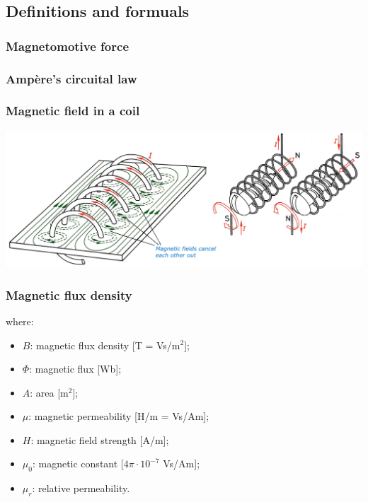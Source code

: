 \documentclass{article}
\begin{document}
\subsection{Definitions and formuals}
\subsubsection{Magnetomotive force}

\subsubsection{Ampère's circuital law}

\subsubsection{Magnetic field in a coil}
\begin{center}
    \includegraphics[width=\textwidth]{media/magneticfield_coil.png}
\end{center}

\newpage
\subsubsection{Magnetic flux density}

where:
\begin{itemize}
    \item $B$: magnetic flux density [T = Vs/m$^2$];
    \item $\Phi$: magnetic flux [Wb];
    \item $A$: area [m$^2$];
    \item $\mu$: magnetic permeability [H/m = Vs/Am];
    \item $H$: magnetic field strength [A/m];
    \item $\mu_0$: magnetic constant [$4\pi\cdot 10^{-7}$ Vs/Am];
    \item $\mu_r$: relative permeability.
\end{itemize}
\end{document}
